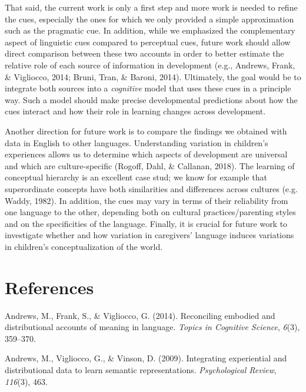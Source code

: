 \documentclass[english,,man]{apa6}
\begin{document}
That said, the current work is only a first step and more work is needed to refine the cues, especially the ones for which we only provided a simple approximation such as the pragmatic cue. In addition, while we emphasized the complementary aspect of linguistic cues compared to perceptual cues, future work should allow direct comparison between these two accounts in order to better estimate the relative role of each source of information in development (e.g., Andrews, Frank, \& Vigliocco, 2014; Bruni, Tran, \& Baroni, 2014). Ultimately, the goal would be to integrate both sources into a \emph{cognitive} model that uses these cues in a principle way. Such a model should make precise developmental predictions about how the cues interact and how their role in learning changes across development.

Another direction for future work is to compare the findings we obtained with data in English to other languages. Understanding variation in children's experiences allows us to determine which aspects of development are universal and which are culture-specific (Rogoff, Dahl, \& Callanan, 2018). The learning of conceptual hierarchy is an excellent case stud; we know for example that superordinate concepts have both similarities and differences across cultures (e.g. Waddy, 1982). In addition, the cues may vary in terms of their reliability from one language to the other, depending both on cultural practices/parenting styles and on the specificities of the language. Finally, it is crucial for future work to investigate whether and how variation in caregivers' language induces variations in children's conceptualization of the world.

\hypertarget{references}{%
\section{References}\label{references}}

\setlength{\parindent}{-0.5in}
\setlength{\leftskip}{0.5in}

\hypertarget{refs}{}
\leavevmode\hypertarget{ref-andrews2014}{}%
Andrews, M., Frank, S., \& Vigliocco, G. (2014). Reconciling embodied and distributional accounts of meaning in language. \emph{Topics in Cognitive Science}, \emph{6}(3), 359--370.

\leavevmode\hypertarget{ref-andrews2009integrating}{}%
Andrews, M., Vigliocco, G., \& Vinson, D. (2009). Integrating experiential and distributional data to learn semantic representations. \emph{Psychological Review}, \emph{116}(3), 463.
\end{document}
